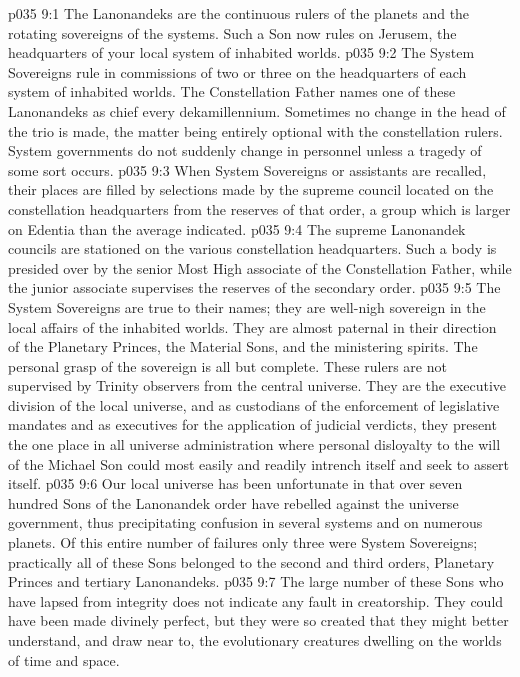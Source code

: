 \vs p035 9:1 The Lanonandeks are the continuous rulers of the planets and the rotating sovereigns of the systems. Such a Son now rules on Jerusem, the headquarters of your local system of inhabited worlds.
\vs p035 9:2 The System Sovereigns rule in commissions of two or three on the headquarters of each system of inhabited worlds. The Constellation Father names one of these Lanonandeks as chief every dekamillennium. Sometimes no change in the head of the trio is made, the matter being entirely optional with the constellation rulers. System governments do not suddenly change in personnel unless a tragedy of some sort occurs.
\vs p035 9:3 When System Sovereigns or assistants are recalled, their places are filled by selections made by the supreme council located on the constellation headquarters from the reserves of that order, a group which is larger on Edentia than the average indicated.
\vs p035 9:4 The supreme Lanonandek councils are stationed on the various constellation headquarters. Such a body is presided over by the senior Most High associate of the Constellation Father, while the junior associate supervises the reserves of the secondary order.
\pc \vs p035 9:5 The System Sovereigns are true to their names; they are well\hyp{}nigh sovereign in the local affairs of the inhabited worlds. They are almost paternal in their direction of the Planetary Princes, the Material Sons, and the ministering spirits. The personal grasp of the sovereign is all but complete. These rulers are not supervised by Trinity observers from the central universe. They are the executive division of the local universe, and as custodians of the enforcement of legislative mandates and as executives for the application of judicial verdicts, they present the one place in all universe administration where personal disloyalty to the will of the Michael Son could most easily and readily intrench itself and seek to assert itself.
\vs p035 9:6 Our local universe has been unfortunate in that over seven hundred Sons of the Lanonandek order have rebelled against the universe government, thus precipitating confusion in several systems and on numerous planets. Of this entire number of failures only three were System Sovereigns; practically all of these Sons belonged to the second and third orders, Planetary Princes and tertiary Lanonandeks.\plusone
\vs p035 9:7 The large number of these Sons who have lapsed from integrity does not indicate any fault in creatorship. They could have been made divinely perfect, but they were so created that they might better understand, and draw near to, the evolutionary creatures dwelling on the worlds of time and space.

